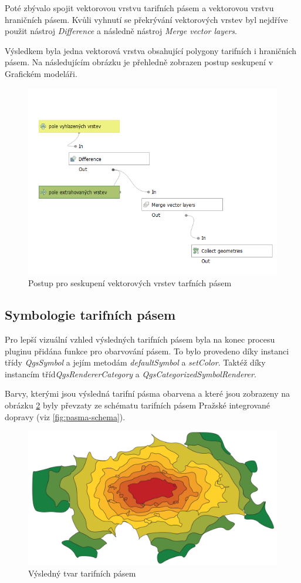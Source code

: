 Poté zbývalo spojit vektorovou vrstvu tarifních pásem a vektorovou vrstvu hraničních pásem. Kvůli vyhnutí se 
překrývání vektorových vrstev byl nejdříve použit nástroj \textit{Difference} a následně nástroj  \textit{Merge vector layers}.

Výsledkem byla jedna vektorová vrstva obsahující polygony tarifních i hraničních pásem. Na následujícím obrázku
je přehledně zobrazen postup seskupení v Grafickém modeláři.

\begin{figure}[H] \centering
    \includegraphics[width=400pt]{./pictures/postup-collecting.png}
    \caption[Postup pro seskupení vektorových vrstev tarfních pásem]{Postup pro seskupení vektorových vrstev tarfních pásem}
	\label{fig:postup-collecting}              
\end{figure}

\subsection{Symbologie tarifních pásem}

Pro lepší vizuální vzhled výsledných tarifních pásem byla na konec procesu pluginu přidána funkce
pro obarvování pásem. To bylo provedeno díky instanci třídy \textit{QgsSymbol} a jejím metodám 
\textit{defaultSymbol} a \textit{setColor}. Taktéž díky instancím tříd\textit{QgsRendererCategory}
a \textit{QgsCategorizedSymbolRenderer}.

Barvy, kterými jsou výsledná tarifní pásma obarvena a které jsou zobrazeny na obrázku \ref{fig:vysledek} byly převzaty
ze schématu tarifních pásem Pražské integrované dopravy (viz \ref{fig:pasma-schema}).  

\begin{figure}[H] \centering
    \includegraphics[width=400pt]{./pictures/vysledek.png}
    \caption[Výsledný tvar tarifních pásem]{Výsledný tvar tarifních pásem}
	\label{fig:vysledek}              
\end{figure}